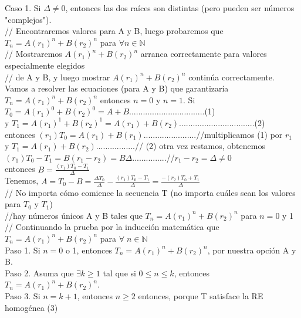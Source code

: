 \documentclass{article}
\begin{document}
Caso 1. Si $\Delta \neq 0$, entonces las dos raíces son distintas (pero pueden ser números "complejos").\\

// Encontraremos valores para A y B, luego probaremos que $T_n = A(r_1)^n + B(r_2)^n$ para $\forall n \in \mathbb{N}$\\
// Mostraremos $A(r_1)^n + B(r_2)^n$ arranca correctamente para valores especialmente elegidos\\
// de A y B, y luego mostrar $A(r_1)^n + B(r_2)^n$ continúa correctamente.\\

Vamos a resolver las ecuaciones (para A y B) que garantizaría $T_n = A(r_1)^n + B(r_2)^n$ entonces $n=0$ y $n=1$. Si\\

$T_0 = A(r_1)^0 + B(r_2)^0 = A + B$.................................(1)\\
 y $T_1 = A(r_1)^1 + B(r_2)^1 = A(r_1) + B(r_2)$.................................(2)\\
 
entonces $(r_1)T_0 = A(r_1) + B(r_1)$.......................//multiplicamos (1) por $r_1$\\
y $T_1 = A(r_1) + B(r_2)$.................// (2) otra vez restamos, obtenemos\\

$(r_1)T_0 - T_1 = B(r_1 - r_2) = B\Delta$...............//$r_1 - r_2 = \Delta \neq 0$\\

entonces $B = \frac{(r_1)T_0 - T_1}{\Delta}$\\

Tenemos, $A=T_0 - B =\frac{\Delta T_0}{\Delta} -\frac{(r_1)T_0 - T_1}{\Delta} = \frac{-(r_2)T_0+T_1}{\Delta}$\\
// No importa cómo comience la secuencia T (no importa cuáles sean los valores para $T_0$ y $T_1$)\\
//hay números únicos A y B tales que $T_n = A(r_1)^n + B(r_2)^n$ para $n = 0$ y 1\\
// Continuando la prueba por la inducción matemática que $T_n= A(r_1)^n + B(r_2)^n$ para $\forall \; n \in \mathbb{N}$\\

Paso 1. Si $n=0$ o 1, entonces $T_n = A(r_1)^n + B(r_2)^n$, por nuestra opción A y B.\\
Paso 2. Asuma que $\exists k \geq 1$ tal que si $0\leq n \leq k$, entonces $T_n = A(r_1)^n + B(r_2)^n$.\\
Paso 3. Si $n= k+1$, entonces $n \geq 2$ entonces, porque T satisface la RE homogénea (3)\\
\end{document}
